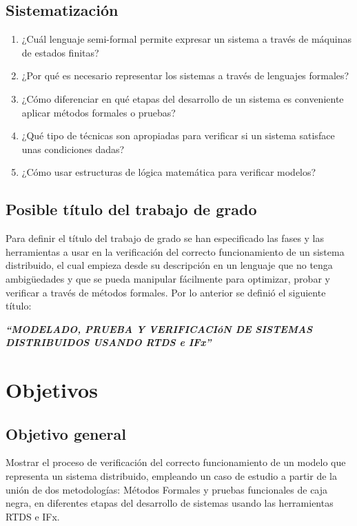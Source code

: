 \subsection{Sistematizaci\'on}

\begin{enumerate}

\item ¿Cu\'al lenguaje semi-formal permite expresar un sistema a trav\'es de 
m\'aquinas de estados finitas?
 \item ¿Por qu\'e es necesario representar los sistemas a trav\'es de lenguajes 
formales?
\item ¿C\'omo diferenciar en qu\'e etapas del desarrollo de un sistema es 
conveniente aplicar m\'etodos formales o pruebas?
\item ¿Qu\'e tipo de t\'ecnicas son apropiadas para verificar si un sistema 
satisface unas condiciones dadas?
\item ¿C\'omo usar estructuras de l\'ogica matem\'atica para verificar 
modelos?
\end{enumerate}

\subsection{Posible t\'itulo del trabajo de grado}
Para definir el t\'itulo del trabajo de grado se han especificado las fases y 
las herramientas a usar en la verificaci\'on del correcto funcionamiento de un 
sistema distribuido, el cual empieza desde su descripci\'on en un lenguaje que 
no tenga ambig\"uedades y que se pueda manipular f\'acilmente para optimizar, 
probar y verificar a trav\'es de m\'etodos formales. Por lo anterior se 
defini\'o el siguiente t\'itulo:

\vspace{50 mm}

\textbf{\textit{``MODELADO, PRUEBA Y VERIFICACI\'oN DE SISTEMAS DISTRIBUIDOS 
USANDO RTDS e IFx''}}


\section{Objetivos}

\subsection{Objetivo general}

Mostrar el proceso de verificaci\'on del correcto funcionamiento de un modelo 
que representa un sistema distribuido, empleando un caso de estudio a partir de 
la uni\'on de dos metodolog\'ias: M\'etodos Formales y pruebas funcionales de 
caja negra, en diferentes etapas del desarrollo de sistemas usando las 
herramientas RTDS e IFx.


